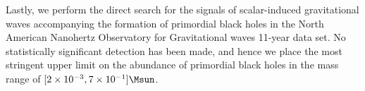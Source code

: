 Lastly, we perform the direct search for the signals of scalar-induced gravitational waves accompanying the formation of primordial black holes in the North American Nanohertz Observatory for Gravitational waves 11-year data set. No statistically significant detection has been made, and hence we place the most stringent upper limit on the abundance of primordial black holes in the mass range of $[2 \times 10^{-3}, 7\times 10^{-1}] \Msun$.


